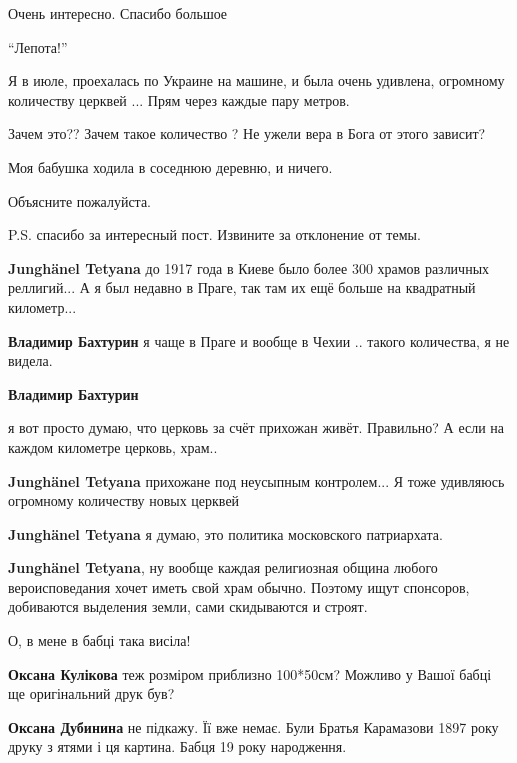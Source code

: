 \begin{itemize}
\begin{itemize}
\end{itemize} %

Очень интересно. Спасибо большое

\enquote{Лепота!}


Я в июле, проехалась по Украине на машине, и была очень удивлена, огромному
количеству церквей ... Прям через каждые пару метров.

Зачем это?? Зачем такое количество ? Не ужели вера в Бога от этого зависит?

Моя бабушка ходила в соседнюю деревню, и ничего.

Объясните пожалуйста.

P.S. спасибо за интересный пост. Извините за отклонение от темы.

\begin{itemize} %
\textbf{Junghänel Tetyana} до 1917 года в Киеве было более 300 храмов различных реллигий...
А я был недавно в Праге, так там их ещё больше на квадратный километр...

\begin{itemize} %
\textbf{Владимир Бахтурин} я чаще в Праге и вообще в Чехии .. такого количества, я не видела.

\textbf{Владимир Бахтурин} 

я вот просто думаю, что церковь за счёт прихожан живёт. Правильно? А если на
каждом километре церковь, храм..

\textbf{Junghänel Tetyana} прихожане под неусыпным контролем...
Я тоже удивляюсь огромному количеству новых церквей
\end{itemize} %

\textbf{Junghänel Tetyana} я думаю, это политика московского патриархата.

\textbf{Junghänel Tetyana}, ну вообще каждая религиозная община любого вероисповедания хочет иметь свой храм обычно. Поэтому ищут спонсоров, добиваются выделения земли, сами скидываются и строят.
\end{itemize} %

О, в мене в бабці така висіла!

\textbf{Оксана Кулікова} теж розміром приблизно 100*50см? Можливо у Вашої бабці ще оригінальний друк був?

\textbf{Оксана Дубинина} не підкажу. Її вже немає. Були Братья Карамазови 1897 року друку з ятями і ця картина. Бабця 19 року народження.

\end{itemize} %
